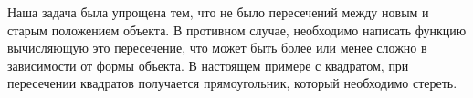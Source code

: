 Наша задача была упрощена тем, что не было пересечений между новым и старым 
положением объекта. В противном случае, необходимо написать функцию вычисляющую 
это пересечение, что может быть более или менее сложно в зависимости от формы 
объекта. В настоящем примере с квадратом, при пересечении квадратов получается 
прямоугольник, который необходимо стереть.